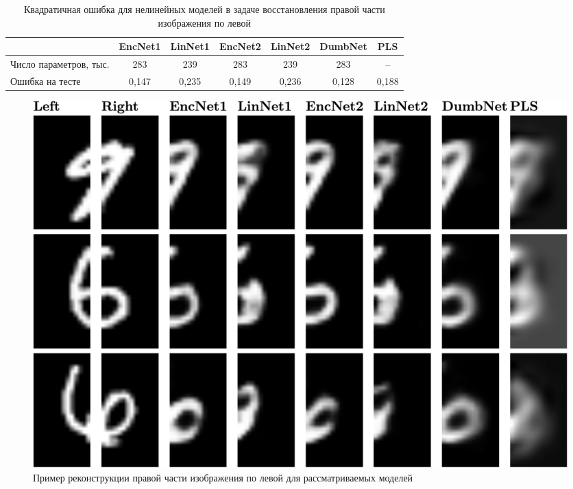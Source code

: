 \begin{table}[!ht]
	\caption{Квадратичная ошибка для нелинейных моделей в задаче восстановления правой части изображения по левой}
	\centering
	\small
	\begin{tabular}{l|cccccc}
	\hline
		& EncNet1 & LinNet1 & EncNet2 & LinNet2 & DumbNet & PLS\\  \hline
		Число параметров, тыс. & 283 & 239 & 283 & 239  & 283 & --\\
		Ошибка на тесте & 0,147 & 0,235 & 0,149 & 0,236 & 0,128 & 0,188 \\
		\hline
	\end{tabular}
	\label{ch2:tbl:mnist_nn_error}
\end{table}

\begin{figure}[!ht]
	\centering 
	\includegraphics[width=\linewidth]{figs/ch2/mnist_preds}
	\caption{Пример реконструкции правой части изображения по левой для рассматриваемых моделей}
	\label{ch2:fig:mnist_nn_preds}
\end{figure}
